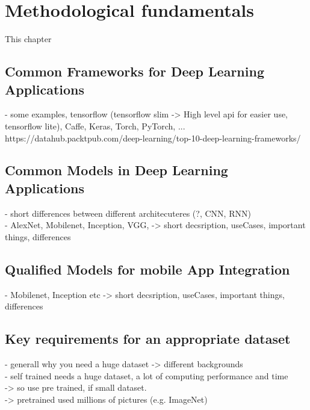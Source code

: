 \section{Methodological fundamentals}
This chapter
	\subsection{Common Frameworks for Deep Learning Applications}
		- some examples, tensorflow (tensorflow slim -> High  level api for easier use, tensorflow lite), Caffe, Keras, Torch, PyTorch, ... \\
		https://datahub.packtpub.com/deep-learning/top-10-deep-learning-frameworks/ \\
	\subsection{Common Models in Deep Learning Applications}
		- short differences between different architecuteres (?, CNN, RNN) \\
 		- AlexNet, Mobilenet, Inception, VGG, -> short decsription, useCases, important things, differences \\
	\subsection{Qualified Models for mobile App Integration}
 		- Mobilenet, Inception etc -> short decsription, useCases, important things, differences \\
	\subsection{Key requirements for an appropriate dataset}
		- generall why you need a huge dataset -> different backgrounds \\
		- self trained needs a huge dataset, a lot of computing performance and time \\
		-> so use pre trained, if small dataset. \\
		-> pretrained used millions of pictures (e.g. ImageNet)